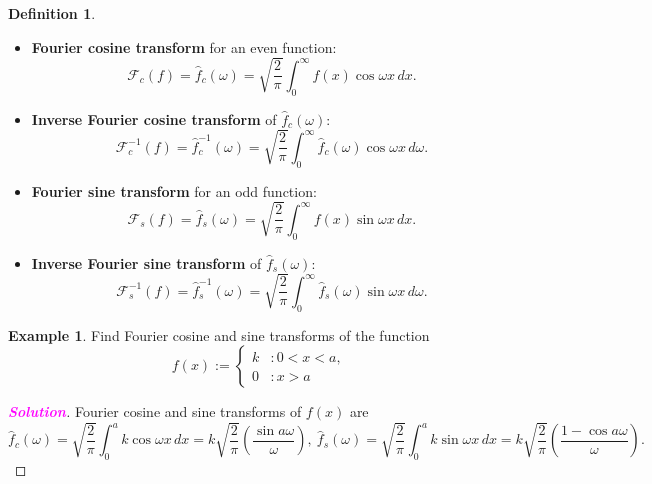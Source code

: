 \documentclass[12pt,openany]{book}
\theoremstyle{definition}
\newtheorem{definition}{Definition}[chapter]
\newtheorem{example}{Example}[chapter]
\newcommand{\sol}{\textcolor{magenta}{\bf Solution}}
\begin{document}
	\begin{tcolorbox}[colframe=defcolor, title={\color{white}\bf Definition (Fourier Cosine and Sine Transforms)}]
		\begin{definition}
			\ \begin{itemize}
				\item \textbf{Fourier cosine transform} for an even function:
				\[
				\mathcal{F}_c(f)=\hat{f}_c(\omega)=\sqrt{\frac{2}{\pi}} \int_{0}^{\infty} f(x) \cos \omega x \, dx.
				\]
				\item \textbf{Inverse Fourier cosine transform} of \( \hat{f}_c(\omega) \):
				\[
				\mathcal{F}_c^{-1}(f)=\hat{f}_c^{-1}(\omega) = \sqrt{\frac{2}{\pi}} \int_{0}^{\infty} \hat{f}_c(\omega) \cos \omega x \, d\omega.
				\]
				\item \textbf{Fourier sine transform} for an odd function:
				\[
				\mathcal{F}_s(f)=\hat{f}_s(\omega) = \sqrt{\frac{2}{\pi}} \int_{0}^{\infty} f(x) \sin \omega x \, dx.
				\]
				\item \textbf{Inverse Fourier sine transform} of \( \hat{f}_s(\omega) \):
				\[
				\mathcal{F}_s^{-1}(f)=\hat{f}_s^{-1}(\omega) = \sqrt{\frac{2}{\pi}} \int_{0}^{\infty} \hat{f}_s(\omega) \sin \omega x \, d\omega.
				\]
			\end{itemize}
		\end{definition}
	\end{tcolorbox}
	\vspace{7pt}
	\begin{example}
		Find Fourier cosine and sine transforms of the function
		\[
		f(x) :=
		\begin{cases}
			k &: 0 < x < a, \\
			0 &:x > a
		\end{cases}
		\]
		\begin{proof}[\sol]
			Fourier cosine and sine transforms of \( f(x) \) are
			\[
			\hat{f}_c(\omega) = \sqrt{\frac{2}{\pi}} \int_{0}^{a} k \cos \omega x \, dx = k\sqrt{\frac{2}{\pi}} \left( \frac{\sin a\omega}{\omega} \right),\
			\hat{f}_s(\omega) = \sqrt{\frac{2}{\pi}} \int_{0}^{a} k \sin \omega x \, dx = k\sqrt{\frac{2}{\pi}} \left( \frac{1 - \cos a\omega}{\omega} \right).
			\]
		\end{proof}
	\end{example}
	
\end{document}
